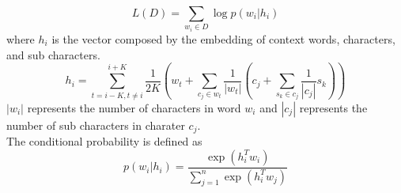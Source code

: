 \begin{equation*}
L(D) = \sum_{w_i \in D} \log p(w_i | h_i)
\end{equation*}
where $h_i$ is the vector composed by the embedding of context words, characters, and sub characters.
\begin{equation*}
h_i = \sum_{t = i - K, t \neq i}^{i+K} \frac{1}{2K}(w_t + \sum_{c_j \in w_t} \frac{1}{|w_t|} (c_j + \sum_{s_k \in c_j} \frac{1}{|c_j|}s_k))
\end{equation*}
$|w_i|$ represents the number of characters in word $w_i$ and $|c_j|$ represents the number of sub characters in charater $c_j$. \\
The conditional probability is defined as
\begin{equation*}
p(w_i |h_i) = \frac{\exp(h_i^T w_i)}{\sum_{j = 1}^n \exp(h_i^T w_j)}
\end{equation*}